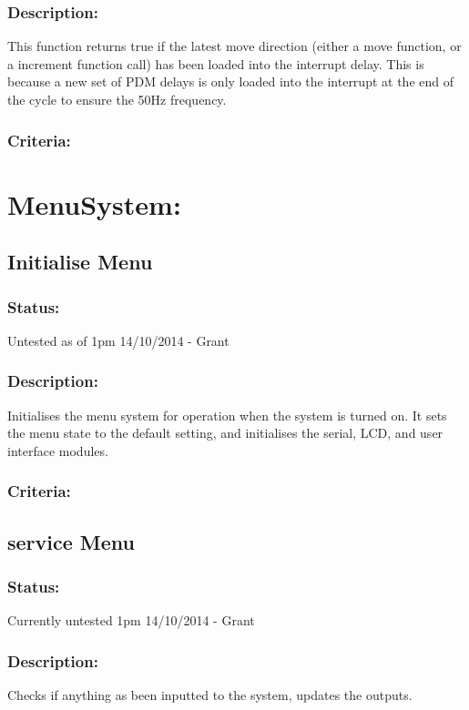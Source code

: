 \documentclass[]{report}
\begin{document}
\subsubsection{Description:}
This function returns true if the latest move direction (either a move function, or a increment function call) has been loaded into the interrupt delay. This is because a new set of PDM delays is only loaded into the interrupt at the end of the cycle to ensure the 50Hz frequency.

\subsubsection{Criteria:}



\newpage
\section{MenuSystem:}
\subsection{Initialise Menu}
\subsubsection{Status:}
Untested as of 1pm 14/10/2014 - Grant

\subsubsection{Description:}
Initialises the menu system for operation when the system is turned on. It sets the menu state to the default setting, and initialises the serial, LCD, and user interface modules.

\subsubsection{Criteria:}

\subsection{service Menu}
\subsubsection{Status:}
Currently untested 1pm 14/10/2014 - Grant

\subsubsection{Description:}
Checks if anything as been inputted to the system, updates the outputs.
\end{document}
